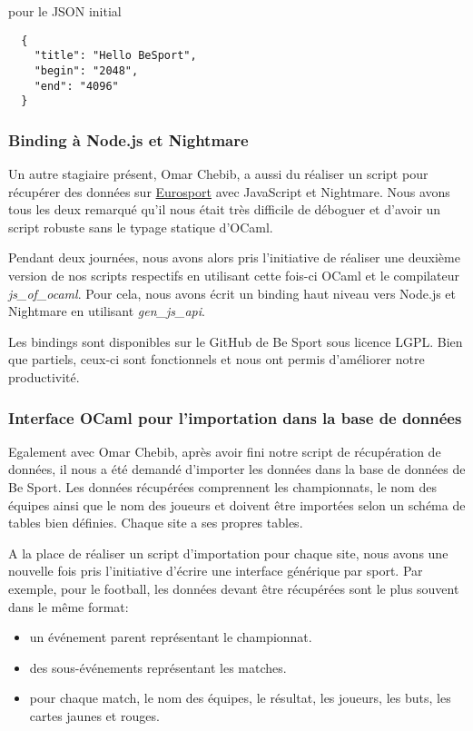 pour le JSON initial
\begin{lstlisting}
  {
    "title": "Hello BeSport",
    "begin": "2048",
    "end": "4096"
  }
\end{lstlisting}

\subsubsection*{Binding à Node.js et Nightmare}

Un autre stagiaire présent, Omar Chebib, a aussi du réaliser un script pour
récupérer des données sur \href{https://eurosport.com}{Eurosport} avec
JavaScript et Nightmare. Nous avons tous les deux remarqué qu'il nous était
très difficile de déboguer et d'avoir un script robuste sans le typage statique
d'OCaml.

Pendant deux journées, nous avons alors pris l'initiative de réaliser une deuxième version de
nos scripts respectifs en utilisant cette fois-ci OCaml et le compilateur
\emph{js\_of\_ocaml}. Pour cela,
nous avons écrit un binding haut niveau vers Node.js et Nightmare en utilisant
\emph{gen\_js\_api}\cite{gen-js-api-github}.

Les bindings\cite{besport-ocaml-node-github,
  besport-ocaml-node-nightmare-github} sont disponibles sur le GitHub de Be Sport sous licence
LGPL. Bien que partiels,
ceux-ci sont fonctionnels et nous ont permis d'améliorer notre productivité.

\subsubsection*{Interface OCaml pour l'importation dans la base de données}

Egalement avec Omar Chebib, après avoir fini notre script de récupération de
données, il nous a été demandé d'importer les données dans la base de données de
Be Sport. Les données récupérées comprennent les championnats, le nom des
équipes ainsi que le nom des joueurs et doivent être importées selon un schéma
de tables bien définies. Chaque site a ses propres tables.

A la place de réaliser un script d'importation pour chaque site, nous avons une
nouvelle fois pris l'initiative d'écrire une interface générique par sport.
Par exemple, pour le football, les données devant être récupérées sont le plus
souvent dans le même format:
\begin{itemize}
  \item un événement parent représentant le championnat.
  \item des sous-événements représentant les matches.
  \item pour chaque match, le nom des équipes, le résultat, les joueurs, les
    buts, les cartes jaunes et rouges.
\end{itemize}

